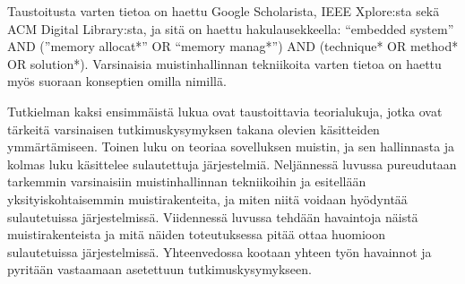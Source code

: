 Taustoitusta varten tietoa on haettu Google Scholarista, IEEE Xplore:sta sekä ACM Digital Library:sta, ja sitä on haettu hakulausekkeella: “embedded system” AND (”memory allocat*” OR “memory manag*”) AND (technique* OR method* OR solution*). Varsinaisia muistinhallinnan tekniikoita varten tietoa on haettu myös suoraan konseptien omilla nimillä.

Tutkielman kaksi ensimmäistä lukua ovat taustoittavia teorialukuja, jotka ovat tärkeitä varsinaisen tutkimuskysymyksen takana olevien käsitteiden ymmärtämiseen. Toinen luku on teoriaa sovelluksen muistin, ja sen hallinnasta ja kolmas luku käsittelee sulautettuja järjestelmiä. Neljännessä luvussa pureudutaan tarkemmin varsinaisiin muistinhallinnan tekniikoihin ja esitellään yksityiskohtaisemmin muistirakenteita, ja miten niitä voidaan hyödyntää sulautetuissa järjestelmissä. Viidennessä luvussa tehdään havaintoja näistä muistirakenteista ja mitä näiden toteutuksessa pitää ottaa huomioon sulautetuissa järjestelmissä. Yhteenvedossa kootaan yhteen työn havainnot ja pyritään vastaamaan asetettuun tutkimuskysymykseen.